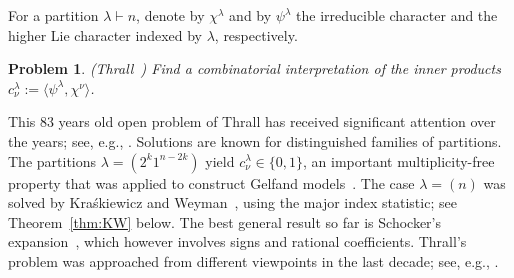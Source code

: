 \documentclass[12pt]%
{amsart}
\renewcommand\S{{\mathcal S}}
\def\red#1{{\color{red}{#1}}}
\theoremstyle{plain}
\newtheorem{problem}[theorem]{Problem}
\theoremstyle{definition}
\theoremstyle{remark}
\newcommand{\todo}[1]{\vspace{5 mm}\par \noindent
	\marginpar{\textsc{ToDo}} \framebox{\begin{minipage}[c]{0.95
				\textwidth}
			#1 \end{minipage}}\vspace{5 mm}\par}
\begin{document}






For a partition $\lambda\vdash n$,
denote by $\chi^\lambda$ and by $\psi^\lambda$ the irreducible character and the higher Lie character indexed by $\lambda$, respectively. 

\begin{problem} {\rm (Thrall~\cite{Thrall})}
Find a combinatorial interpretation of the inner products 
$c_\nu^{\lambda}:=\langle \psi^\lambda,\chi^\nu\rangle$.
\end{problem}

This 83 years old open problem of Thrall 
has received significant attention over the years; 
see, e.g., \cite{Brandt, Klyachko, KraskiewiczWeyman, Garsia, GR93, Reutenauer, Sundaram94, Schocker}. 
Solutions are known for distinguished families of partitions.  
The partitions $\lambda = (2^k 1^{n-2k})$ 
yield $c_\nu^\lambda \in \{0,1\}$, an important multiplicity-free property that was applied to construct Gelfand models~\cite{Inglis}. 
The case $\lambda = (n)$ was solved by Kra\'{s}kiewicz and Weyman~\cite{KraskiewiczWeyman}, using the major index statistic; see Theorem~\ref{thm:KW} below. 
The best general result so far is Schocker's expansion~\cite[Theorem~3.1]{Schocker}, which 
however involves signs and rational coefficients.
Thrall's problem was approached from different viewpoints in the last decade; 
see, e.g., \cite{Hersh, Reiner-Banff, AS_Thrall, Sundaram18, 
AHR, Lim, Pak, Armon, Amendola, Commins}.  
\end{document}
